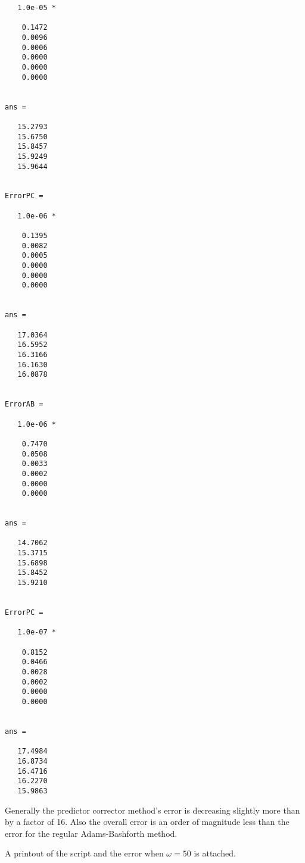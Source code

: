 \documentclass[11pt]{article}
\begin{document}
\begin{enumerate}
\begin{enumerate}
\begin{verbatim}
   1.0e-05 *

    0.1472
    0.0096
    0.0006
    0.0000
    0.0000
    0.0000


ans =

   15.2793
   15.6750
   15.8457
   15.9249
   15.9644


ErrorPC =

   1.0e-06 *

    0.1395
    0.0082
    0.0005
    0.0000
    0.0000
    0.0000


ans =

   17.0364
   16.5952
   16.3166
   16.1630
   16.0878


ErrorAB =

   1.0e-06 *

    0.7470
    0.0508
    0.0033
    0.0002
    0.0000
    0.0000


ans =

   14.7062
   15.3715
   15.6898
   15.8452
   15.9210


ErrorPC =

   1.0e-07 *

    0.8152
    0.0466
    0.0028
    0.0002
    0.0000
    0.0000


ans =

   17.4984
   16.8734
   16.4716
   16.2270
   15.9863
                \end{verbatim}
                Generally the predictor corrector method's error is decreasing
                slightly more than by a factor of 16.
                Also the overall error is an order of magnitude
                less than the error for the regular Adams-Bashforth method.

                A printout of the script and the error when $\omega = 50$ is
                attached.

        \end{enumerate}
\end{enumerate}
\end{document}
